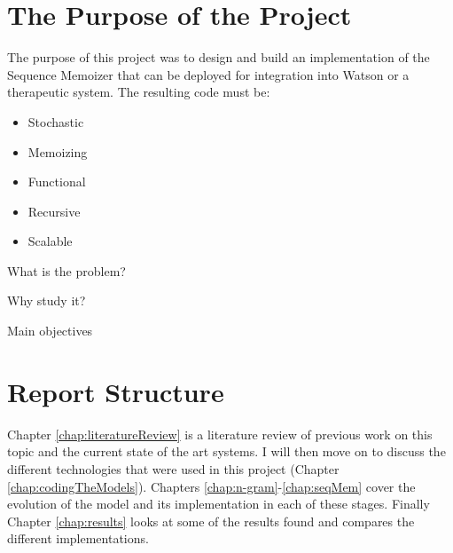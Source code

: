 


\section{The Purpose of the Project}


The purpose of this project was to design and build an implementation of the Sequence Memoizer that can be deployed for integration into Watson or a therapeutic system. The resulting code must be:

\begin{itemize}
\item Stochastic
\item Memoizing
\item Functional
\item Recursive
\item Scalable
\end{itemize}


What is the problem?

Why study it?

Main objectives

\section{Report Structure}

Chapter \ref{chap:literatureReview} is a literature review of previous work on this topic and the current state of the art systems. I will then move on to discuss the different technologies that were used in this project (Chapter \ref{chap:codingTheModels}). Chapters \ref{chap:n-gram}-\ref{chap:seqMem} cover the evolution of the model and its implementation in each of these stages. Finally Chapter \ref{chap:results} looks at some of the results found and compares the different implementations.